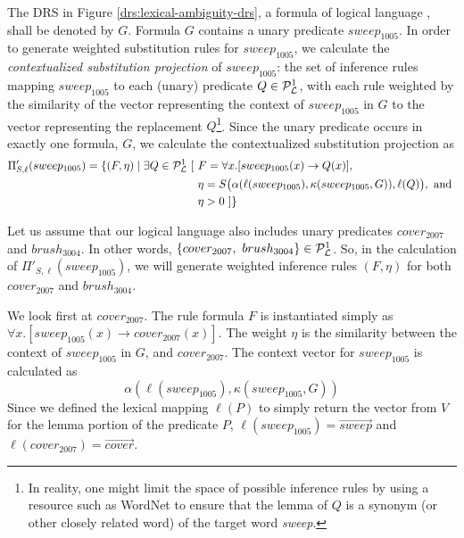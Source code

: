 The DRS in Figure \ref{drs:lexical-ambiguity-drs}, a formula of logical language
\loglang, shall be denoted by $G$.  Formula $G$ contains a unary predicate
$sweep_{1005}$.  In order to generate weighted substitution rules for
$sweep_{1005}$, we calculate the {\it contextualized substitution projection} of
$sweep_{1005}$: the set of inference rules mapping $sweep_{1005}$ to each
(unary) predicate $Q \in {\cal{P}}_{{\cal{L}}}^1$, with each rule weighted by the
similarity of the vector representing the context of $sweep_{1005}$ in $G$
to the vector representing the replacement $Q$\footnote{In reality, one might
limit the space of possible inference rules by using a resource such as
WordNet to ensure that the lemma of $Q$ is a synonym (or other closely related
word) of the target word {\it sweep}.}.
Since the unary predicate  occurs in exactly one formula, $G$, we calculate the 
contextualized substitution projection as 
\begin{align*}
\Pi'_{S, \ell}(sweep_{1005}) =  
\{ (F, \eta) \mid \exists Q \in {\cal{P}}_{{\cal{L}}}^1~[ 
&~F = \forall x.[sweep_{1005}(x) \to Q(x)], \\
&~\eta = S\big(\alpha(\ell(sweep_{1005}), \kappa(sweep_{1005}, G)), \ell(Q)\big), \text{ and } \\
&~ \eta > 0 ~] \}
\end{align*}

Let us assume that our logical language \loglang also includes unary predicates
$cover_{2007}$ and $brush_{3004}$.  In other words, $\{ cover_{2007},~
brush_{3004} \} \in {\cal{P}}_{{\cal{L}}}^1$.
So, in the calculation of $\Pi'_{S, \ell}(sweep_{1005})$, we will generate
weighted inference rules $(F,\eta)$ for both $cover_{2007}$ and $brush_{3004}$.

We look first at $cover_{2007}$.  The rule formula $F$ is instantiated simply as
$\forall x.[sweep_{1005}(x) \to cover_{2007}(x)]$.  The weight $\eta$ is the
similarity between the context of $sweep_{1005}$ in $G$, and $cover_{2007}$.
The context vector for $sweep_{1005}$ is calculated as \[
\alpha(\ell(sweep_{1005}), \kappa(sweep_{1005}, G)) \]  Since we defined the
lexical mapping $\ell(P)$ to simply return the vector from $V$ for the lemma
portion of the predicate $P$, $\ell(sweep_{1005}) = \vec{sweep}$ and
$\ell(cover_{2007}) = \vec{cover}$.  

